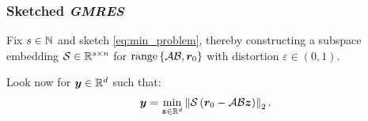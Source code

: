 \begin{frame}
    \frametitle{Sketched \textit{GMRES}}

    Fix $s \in \mathbb{N}$ and sketch \cref{eq:min_problem}, thereby constructing a subspace embedding $\mathcal{S} \in \mathbb{R}^{s \times n}$ for $\operatorname*{range}\left\{\mathcal{A} \mathcal{B}, \bm{r}_0\right\}$ with distortion $\varepsilon \in \left(0, 1\right)$.

    Look now for $\bm{y} \in \mathbb{R}^{d}$ such that:
    \begin{align}
        \bm{y} = \min_{\bm{z} \in \mathbb{R}^{d}} \left\lVert  \mathcal{S} \left( \bm{r}_0 - \mathcal{A} \mathcal{B} \bm{z} \right) \right\rVert_2. \label{eq:sketched_min_problem}
    \end{align}
    
\end{frame}